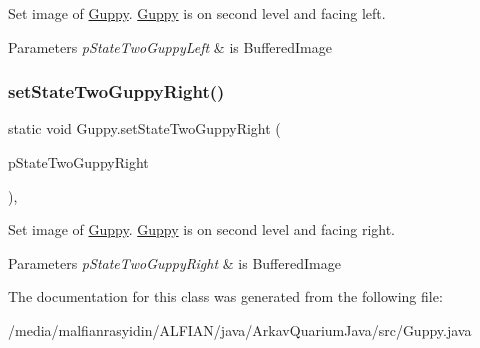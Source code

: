 Set image of \mbox{\hyperlink{class_guppy}{Guppy}}. \mbox{\hyperlink{class_guppy}{Guppy}} is on second level and facing left.


\begin{DoxyParams}{Parameters}
{\em p\+State\+Two\+Guppy\+Left} & is Buffered\+Image \\
\hline
\end{DoxyParams}
\mbox{\label{class_guppy_a17a6b8605b82965f1e6c290aa12da7a6}} 
\subsubsection{\texorpdfstring{set\+State\+Two\+Guppy\+Right()}{setStateTwoGuppyRight()}}
{\footnotesize\ttfamily static void Guppy.\+set\+State\+Two\+Guppy\+Right (\begin{DoxyParamCaption}\item[{final Buffered\+Image}]{p\+State\+Two\+Guppy\+Right }\end{DoxyParamCaption})\hspace{0.3cm}{\ttfamily [inline]}, {\ttfamily [static]}}

Set image of \mbox{\hyperlink{class_guppy}{Guppy}}. \mbox{\hyperlink{class_guppy}{Guppy}} is on second level and facing right.


\begin{DoxyParams}{Parameters}
{\em p\+State\+Two\+Guppy\+Right} & is Buffered\+Image \\
\hline
\end{DoxyParams}


The documentation for this class was generated from the following file\+:\begin{DoxyCompactItemize}
\item 
/media/malfianrasyidin/\+A\+L\+F\+I\+A\+N/java/\+Arkav\+Quarium\+Java/src/Guppy.\+java\end{DoxyCompactItemize}
